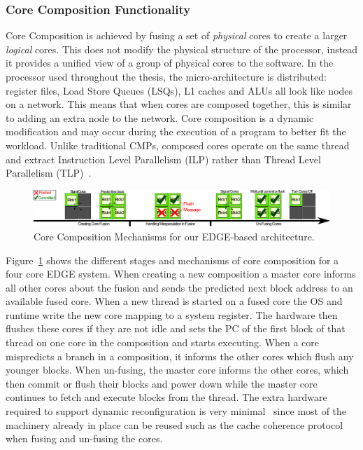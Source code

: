 \subsubsection{Core Composition Functionality}\label{chp:Background:sec:EDGE}

Core Composition is achieved by fusing a set of \textit{physical} cores to create a larger \textit{logical} cores.
This does not modify the physical structure of the processor, instead it provides a unified view of a group of physical cores to the software.
In the processor used throughout the thesis, the micro-architecture is distributed: register files, Load Store Queues (LSQs), L1 caches and ALUs all look like nodes on a network.
This means that when cores are composed together, this is similar to adding an extra node to the network.
Core composition is a dynamic modification and may occur during the execution of a program to better fit the workload.
Unlike traditional CMPs, composed cores operate on the same thread and extract Instruction Level Parallelism (ILP) rather than Thread Level Parallelism (TLP)~\cite{micolet2016dmpstream,pricopi2012bahurupi}.

\begin{figure}
 \center
 \includegraphics[width=1\textwidth]{cases-paper/graphics/background/proc_test.pdf}
 \caption{Core Composition Mechanisms for our EDGE-based architecture.}\label{fig:dmp}
 \end{figure}
 
Figure~\ref{fig:dmp} shows the different stages and mechanisms of core composition for a four core EDGE system.
When creating a new composition a master core informs all other cores about the fusion and sends the predicted next block address to an available fused core.
When a new thread is started on a fused core the OS and runtime write the new core mapping to a system register.
The hardware then flushes these cores if they are not idle and sets the PC of the first block of that thread on one core in the composition and starts executing.
When a core mispredicts a branch in a composition, it informs the other cores which flush any younger blocks.
When un-fusing, the master core informs the other cores, which then commit or flush their blocks and power down while the master core continues to fetch and execute blocks from the thread.
The extra hardware required to support dynamic reconfiguration is very minimal~\cite{kim2007tflex} since most of the machinery already in place can be reused such as the cache coherence protocol when fusing and un-fusing the cores.

